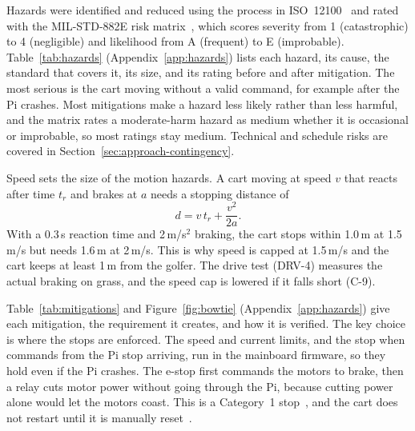 \label{sec:risks}

\label{sec:risks-assessment}

Hazards were identified and reduced using the process in ISO~12100~\cite{iso12100} and rated with the MIL-STD-882E risk matrix~\cite{milstd882e}, which scores severity from 1 (catastrophic) to 4 (negligible) and likelihood from A (frequent) to E (improbable). Table~\ref{tab:hazards} (Appendix~\ref{app:hazards}) lists each hazard, its cause, the standard that covers it, its size, and its rating before and after mitigation. The most serious is the cart moving without a valid command, for example after the Pi crashes. Most mitigations make a hazard less likely rather than less harmful, and the matrix rates a moderate-harm hazard as medium whether it is occasional or improbable, so most ratings stay medium. Technical and schedule risks are covered in Section~\ref{sec:approach-contingency}.

Speed sets the size of the motion hazards. A cart moving at speed $v$ that reacts after time $t_r$ and brakes at $a$ needs a stopping distance of
\begin{equation}
d = v\,t_r + \frac{v^2}{2a} .
\label{eq:stopping}
\end{equation}
With a 0.3\,s reaction time and 2\,m/s$^2$ braking, the cart stops within 1.0\,m at 1.5\,m/s but needs 1.6\,m at 2\,m/s. This is why speed is capped at 1.5\,m/s and the cart keeps at least 1\,m from the golfer. The drive test (DRV-4) measures the actual braking on grass, and the speed cap is lowered if it falls short (C-9).

\label{sec:risks-mitigation}

Table~\ref{tab:mitigations} and Figure~\ref{fig:bowtie} (Appendix~\ref{app:hazards}) give each mitigation, the requirement it creates, and how it is verified. The key choice is where the stops are enforced. The speed and current limits, and the stop when commands from the Pi stop arriving, run in the mainboard firmware, so they hold even if the Pi crashes. The e-stop first commands the motors to brake, then a relay cuts motor power without going through the Pi, because cutting power alone would let the motors coast. This is a Category~1 stop~\cite{iec60204-1}, and the cart does not restart until it is manually reset~\cite{iso13850}.

